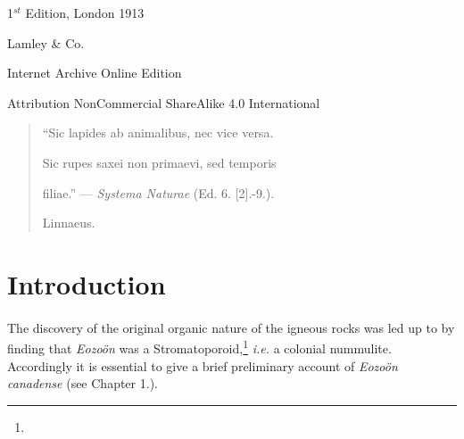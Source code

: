 \documentclass[a4paper, 12pt, oneside]{article}
\begin{document}
\begin{titlepage}
	
		
	\vspace*{\fill}%
	
	1$^{st}$ Edition, London 1913 %
	
	{\small Lamley \& Co. } %

	\vspace{1\baselineskip} %

    Internet Archive Online Edition  %
	
	{\small Attribution NonCommercial ShareAlike 4.0 International } %
\end{titlepage}
\pagestyle{fancy}
\fancyhf{}
\cfoot{\Fontauri{\thepage}}
\Large
\vspace*{\fill}
\begin{quote} 
``Sic lapides ab animalibus, nec vice versa.

Sic rupes saxei non primaevi, sed temporis

filiae.'' --- \emph{Systema Naturae} (Ed. 6. [2].-9.).

Linnaeus.
\end{quote}
\vspace*{\fill}
\clearpage
\setlength{\parskip}{1mm plus1mm minus1mm}
\setcounter{tocdepth}{3}
\setcounter{secnumdepth}{3}
\tableofcontents
\clearpage
\section*{Introduction}
\paragraph{}
The discovery of the original organic nature of the igneous rocks was led up to by finding that \emph{Eozoön} was a Stromatoporoid,\footnote{} \emph{i.e.} a colonial nummulite. Accordingly it is essential to give a brief preliminary account of \emph{Eozoön canadense} (see Chapter 1.).
\end{document}
